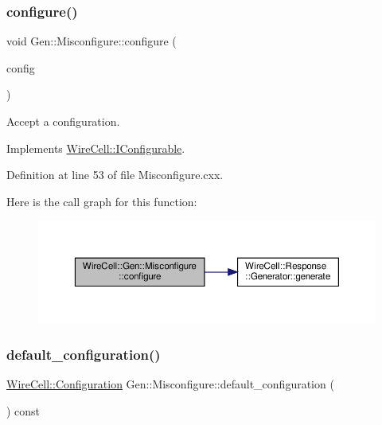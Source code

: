 \subsubsection{\texorpdfstring{configure()}{configure()}}
{\footnotesize\ttfamily void Gen\+::\+Misconfigure\+::configure (\begin{DoxyParamCaption}\item[{const \hyperlink{namespace_wire_cell_a9f705541fc1d46c608b3d32c182333ee}{Wire\+Cell\+::\+Configuration} \&}]{config }\end{DoxyParamCaption})\hspace{0.3cm}{\ttfamily [virtual]}}



Accept a configuration. 



Implements \hyperlink{class_wire_cell_1_1_i_configurable_a57ff687923a724093df3de59c6ff237d}{Wire\+Cell\+::\+I\+Configurable}.



Definition at line 53 of file Misconfigure.\+cxx.

Here is the call graph for this function\+:
\nopagebreak
\begin{figure}[H]
\begin{center}
\leavevmode
\includegraphics[width=350pt]{class_wire_cell_1_1_gen_1_1_misconfigure_a99eea8b08c7ca7a5ea9bbc79e7bce228_cgraph}
\end{center}
\end{figure}
\mbox{\label{class_wire_cell_1_1_gen_1_1_misconfigure_acf1e6224e2aaadd3162e17f79dc4557b}} 
\subsubsection{\texorpdfstring{default\+\_\+configuration()}{default\_configuration()}}
{\footnotesize\ttfamily \hyperlink{namespace_wire_cell_a9f705541fc1d46c608b3d32c182333ee}{Wire\+Cell\+::\+Configuration} Gen\+::\+Misconfigure\+::default\+\_\+configuration (\begin{DoxyParamCaption}{ }\end{DoxyParamCaption}) const\hspace{0.3cm}{\ttfamily [virtual]}}



